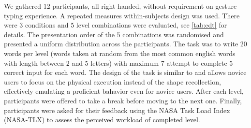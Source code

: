 \documentclass{chi-ext}
\begin{document}

We gathered 12 participants, all right handed, without requirement on gesture typing experience. A repeated measures within-subjects design was used. There were 3 conditions and 5 level combinations were evaluated, see \autoref{tab:cdt} for details. The presentation order of the 5 combinations was randomised and presented a uniform distribution across the participants. The task was to write 20 words per level (words taken at random from the most common english words with length between 2 and 5 letters) with maximum 7 attempt to complete 5 correct input for each word. The design of the task is similar to \cite{Quinn2016} and allows novice users to focus on the physical execution instead of the shape recollection, effectively emulating a proficient bahavior even for novice users. After each level, participants were offered to take a break before moving to the next one. Finally, participants were asked for their feedback using the NASA Task Load Index~\cite{Hart1988} (NASA-TLX) to assess the perceived workload of completed level.
\end{document}
